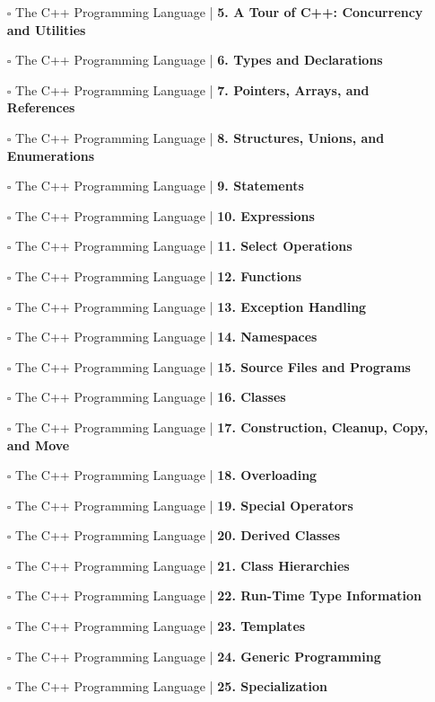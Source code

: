 \documentclass[a4, landscape, 12pt]{article}
\newcommand{\checkbox}{$\square$}%
\begin{document}
\begin{itemize}
{}
\item [\checkbox]  The C++ Programming Language | \textbf{ 5. A Tour of C++: Concurrency and Utilities
}
\item [\checkbox]  The C++ Programming Language | \textbf{ 6. Types and Declarations
}
\item [\checkbox]  The C++ Programming Language | \textbf{ 7. Pointers, Arrays, and References
}
\item [\checkbox]  The C++ Programming Language | \textbf{ 8. Structures, Unions, and Enumerations
}
\item [\checkbox]  The C++ Programming Language | \textbf{ 9. Statements
}
\item [\checkbox]  The C++ Programming Language | \textbf{ 10. Expressions
}
\item [\checkbox]  The C++ Programming Language | \textbf{ 11. Select Operations
}
\item [\checkbox]  The C++ Programming Language | \textbf{ 12. Functions
}
\item [\checkbox]  The C++ Programming Language | \textbf{ 13. Exception Handling
}
\item [\checkbox]  The C++ Programming Language | \textbf{ 14. Namespaces
}
\item [\checkbox]  The C++ Programming Language | \textbf{ 15. Source Files and Programs
}
\item [\checkbox]  The C++ Programming Language | \textbf{ 16. Classes
}
\item [\checkbox]  The C++ Programming Language | \textbf{ 17. Construction, Cleanup, Copy, and Move
}
\item [\checkbox]  The C++ Programming Language | \textbf{ 18. Overloading
}
\item [\checkbox]  The C++ Programming Language | \textbf{ 19. Special Operators
}
\item [\checkbox]  The C++ Programming Language | \textbf{ 20. Derived Classes
}
\item [\checkbox]  The C++ Programming Language | \textbf{ 21. Class Hierarchies
}
\item [\checkbox]  The C++ Programming Language | \textbf{ 22. Run-Time Type Information
}
\item [\checkbox]  The C++ Programming Language | \textbf{ 23. Templates
}
\item [\checkbox]  The C++ Programming Language | \textbf{ 24. Generic Programming
}
\item [\checkbox]  The C++ Programming Language | \textbf{ 25. Specialization
}
\end{itemize}
\end{document}
